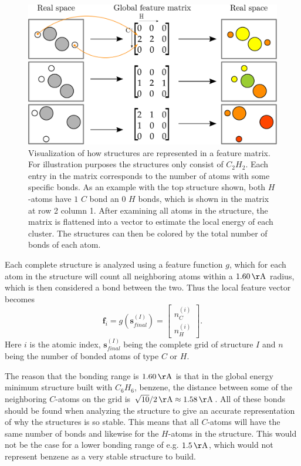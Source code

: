\begin{figure}
	\centering
	\centerline{
		\includegraphics[width=\columnwidth]{graphics/structure_representation.pdf}
		}
	\captionsetup{width=1.2\columnwidth}
	\caption{Visualization of how structures are represented in a feature matrix. For illustration purposes the structures only consist of $C_2H_2$. Each entry in the matrix corresponds to the number of atoms with some specific bonds. As an example with the top structure shown, both $H$-atoms have $1$ $C$ bond an $0$ $H$ bonds, which is shown in the matrix at row 2 column 1. After examining all atoms in the structure, the matrix is flattened into a vector to estimate the local energy of each cluster. The structures can then be colored by the total number of bonds of each atom.}
	\label{fig:struc_representation}
\end{figure}
Each complete structure is analyzed using a feature function $g$, which for each atom in the structure will count all neighboring atoms within a $\SI{1.60}{\AA}$ radius, which is then considered a bond between the two. Thus the local feature vector becomes 
\begin{equation}
	\mathbf{f}_i = g(\mathbf{s}^{(I)}_{final}) =
	\begin{bmatrix}
	n_C^{(i)} \\
	n_H^{(i)}
	\end{bmatrix}.
\end{equation}
Here $i$ is the atomic index, $\mathbf{s}^{(I)}_{final}$ being the complete grid of structure $I$ and $n$ being the number of bonded atoms of type $C$ or $H$.

The reason that the bonding range is $\SI{1.60}{\AA}$ is that in the global energy minimum structure built with $C_6H_6$, benzene, the distance between some of the neighboring $C$-atoms on the grid is $\sqrt{10}/2 \, \SIUnitSymbolAngstrom \approx \SI{1.58}{\AA}$. All of these bonds should be found when analyzing the structure to give an accurate representation of why the structures is so stable. This means that all $C$-atoms will have the same number of bonds and likewise for the $H$-atoms in the structure. This would not be the case for a lower bonding range of e.g. $\SI{1.5}{\AA}$, which would not represent benzene as a very stable structure to build.\\

